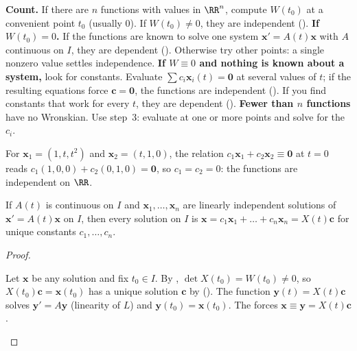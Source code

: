 \documentclass[10pt]{scrartcl}
\newcommand{\vv}[1]{\mathbf{#1}}
\newenvironment{howto}[1]{\begin{mdframed}[style=howtostyle,frametitle={#1}]}{\end{mdframed}}
\begin{document}
\begin{howto}{How to decide whether vector functions are linearly independent on an interval}
  \begin{steps}
    \ii \textbf{Count.} If there are $n$ functions with values in $\RR^n$, compute $W(t_0)$ at a convenient point $t_0$ (usually $0$). If $W(t_0)\neq 0$, they are independent ().
    \ii \textbf{If $W(t_0)=0$.} If the functions are known to solve one system $\vv x'=A(t)\vv x$ with $A$ continuous on $I$, they are dependent (). Otherwise try other points: a single nonzero value settles independence.
    \ii \textbf{If $W\equiv 0$ and nothing is known about a system,} look for constants. Evaluate $\sum c_i\vv x_i(t)=\vv 0$ at several values of $t$; if the resulting equations force $\vv c=\vv 0$, the functions are independent (). If you find constants that work for every $t$, they are dependent ().
    \ii \textbf{Fewer than $n$ functions} have no Wronskian. Use step~3: evaluate at one or more points and solve for the $c_i$.
  \end{steps}
\end{howto}

\begin{example*}
  For $\vv x_1=(1,t,t^2)$ and $\vv x_2=(t,1,0)$, the relation $c_1\vv x_1+c_2\vv x_2\equiv\vv 0$ at $t=0$ reads $c_1(1,0,0)+c_2(0,1,0)=\vv 0$, so $c_1=c_2=0$: the functions are independent on $\RR$.
\end{example*}

\begin{theorem*}
  If $A(t)$ is continuous on $I$ and $\vv x_1,\dots,\vv x_n$ are linearly independent solutions of $\vv x'=A(t)\vv x$ on $I$, then every solution on $I$ is $\vv x=c_1\vv x_1+\dots+c_n\vv x_n=X(t)\vv c$ for unique constants $c_1,\dots,c_n$.
\end{theorem*}
\begin{proof}
  \begin{steps}
    \ii Let $\vv x$ be any solution and fix $t_0\in I$. By , $\det X(t_0)=W(t_0)\neq 0$, so $X(t_0)\vv c=\vv x(t_0)$ has a unique solution $\vv c$ by ().
    \ii The function $\vv y(t)=X(t)\vv c$ solves $\vv y'=A\vv y$ (linearity of $L$) and $\vv y(t_0)=\vv x(t_0)$. The  forces $\vv x\equiv\vv y=X(t)\vv c$. \qedhere
  \end{steps}
\end{proof}
\end{document}
